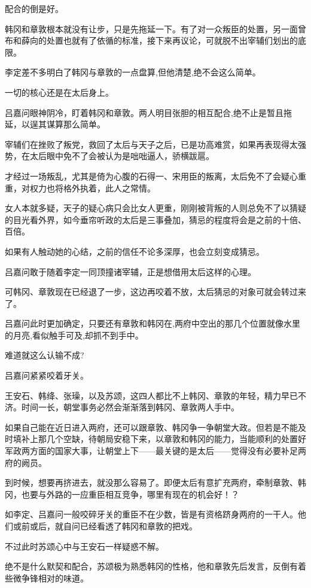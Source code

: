配合的倒是好。

韩冈和章敦根本就没有让步，只是先拖延一下。有了对一众叛臣的处置，另一面曾布和薛向的处置也就有了依循的标准，接下来再议论，可就脱不出宰辅们划出的底限。

李定差不多明白了韩冈与章敦的一点盘算,但他清楚,绝不会这么简单。

一切的核心还是在太后身上。

吕嘉问眼神阴冷，盯着韩冈和章敦。两人明目张胆的相互配合,绝不止是暂且拖延，以逞其谋算那么简单。

宰辅们在挫败了叛党，救回了太后与天子之后，已是功高难赏，如果再表现得太强势，在太后眼中免不了会被认为是咄咄逼人，骄横跋扈。

才经过一场叛乱，尤其是倚为心腹的石得一、宋用臣的叛离，太后免不了会疑心重重，对权力也将格外执着，此人之常情。

女人本就多疑，天子的疑心病只会比女人更重，刚刚被背叛的人则总免不了以猜疑的目光看外界，如今垂帘听政的太后是三事叠加，猜忌的程度将会是之前的十倍、百倍。

如果有人触动她的心结，之前的信任不论多深厚，也会立刻变成猜忌。

吕嘉问敢于随着李定一同顶撞诸宰辅，正是想借用太后这样的心理。

可韩冈、章敦现在已经退了一步，这边再咬着不放，太后猜忌的对象可就会转过来了。

吕嘉问此时更加确定，只要还有章敦和韩冈在,两府中空出的那几个位置就像水里的月亮,看似触手可及,却抓不到手中。

难道就这么认输不成?

吕嘉问紧紧咬着牙关。

王安石、韩绛、张璪，以及苏颂，这四人都比不上韩冈、章敦的年轻，精力早已不济。时间一长，朝堂事务必然会渐渐落到韩冈、章敦两人手中。

如果自己能在近日进入两府，还可以跟章敦、韩冈争一争朝堂大政。但若是不能及时填补上那几个空缺，待朝局安稳下来，以章敦和韩冈的能力，当能顺利的处置好军政两方面的国家大事，让朝堂上下——最关键的是太后——觉得没有必要补足两府的阙员。

到时候，想要再挤进去，就没那么容易了。即便太后有意扩充两府，牵制章敦、韩冈，也要与外路的一应重臣相互竞争，哪里有现在的机会好！？

如李定、吕嘉问一般咬碎牙关的重臣不在少数，皆是有资格跻身两府的一干人。他们或前或后，就自问已经看透了韩冈和章敦的把戏。

不过此时苏颂心中与王安石一样疑惑不解。

绝不是什么默契和配合，苏颂极为熟悉韩冈的性格，他和章敦先后发言，反倒有着些微争锋相对的味道。

